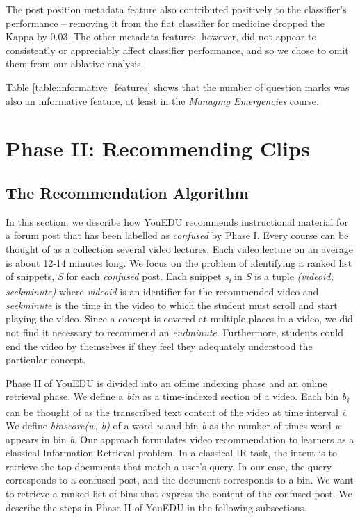 \documentclass{edm_template}
\begin{document}
The post position metadata feature also contributed positively to the classifier's performance -- removing it from the flat classifier for medicine dropped the Kappa by 0.03. The other metadata features, however, did not appear to consistently or appreciably affect classifier performance, and so we chose to omit them from our ablative analysis.

Table \ref{table:informative_features} shows that the number of question marks was also an informative feature, at least in the \emph{Managing Emergencies} course. 

\section{Phase II: Recommending Clips}
\label{sec:clipRecommendation}
\vspace{1mm}
\subsection{The Recommendation Algorithm}
\vspace{1mm}
In this section, we describe how YouEDU recommends instructional material for a forum post that
has been labelled as \textit{confused} by Phase I. Every course can be thought of as a collection several video lectures. Each video lecture on an average is about 12-14 minutes long. We focus on the problem of identifying a ranked list of snippets, \textit{S} for each \textit{confused} post. Each snippet \textit{s\textsubscript i} in \textit{S} is a tuple \textit{(video\textunderscore id, seek\textunderscore minute)} where \textit{video\textunderscore id} is an identifier for the recommended video and \textit{seek\textunderscore minute} is the time in the video to which the student must scroll and start playing the video. Since a concept is covered at multiple places in a video, we did not find it necessary to recommend an \textit{end\textunderscore minute}. Furthermore, students could end the video by themselves if they feel they adequately understood the particular concept.

Phase II of YouEDU is divided into an offline indexing phase and an online retrieval phase.
We define a \textit {bin} as a time-indexed section of a video. Each bin \textit{b\textsubscript{i}} can be thought of as the transcribed text content of the video
at time interval \textit{i}. We define \textit{bin\textunderscore score(w, b)} of a word \textit{w} and bin \textit{b} as the number of times word \textit{w} appears in bin \textit{b}. Our approach formulates video recommendation to learners as a classical Information Retrieval problem. In a classical IR task, the intent is to retrieve the top documents that match a user's query. In our case, the query corresponds to a confused post, and the document corresponds to a bin. We want to retrieve a ranked list of bins that express the content of the confused post. We describe the steps in Phase II of YouEDU in the following subsections.
\end{document}
